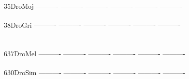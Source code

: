 \documentclass[11pt,twoside,reqno,a4paper]{article}
\begin{document}
{35\hspace*{3\charwidth}DroMoj	----------	----------	----------	----------	----------	----------	\\
\hspace*{5\charwidth}\hspace*{7\charwidth}\hspace*{1\charwidth}\hspace*{1\charwidth}\hspace*{1\charwidth}\hspace*{1\charwidth}\hspace*{1\charwidth}\hspace*{1\charwidth}\\
38\hspace*{3\charwidth}DroGri	----------	----------	----------	----------	----------	----------	\\
\hspace*{5\charwidth}\hspace*{7\charwidth}\hspace*{1\charwidth}\hspace*{1\charwidth}\hspace*{1\charwidth}\hspace*{1\charwidth}\hspace*{1\charwidth}\hspace*{1\charwidth}\\
\\
637\hspace*{2\charwidth}DroMel	----------	----------	----------	----------	----------	----------	\\
\hspace*{5\charwidth}\hspace*{7\charwidth}\hspace*{1\charwidth}\hspace*{1\charwidth}\hspace*{1\charwidth}\hspace*{1\charwidth}\hspace*{1\charwidth}\hspace*{1\charwidth}\\
630\hspace*{2\charwidth}DroSim	----------	----------	----------	----------	----------	----------	\\
\hspace*{5\charwidth}\hspace*{7\charwidth}\hspace*{1\charwidth}\hspace*{1\charwidth}\hspace*{1\charwidth}\hspace*{1\charwidth}\hspace*{1\charwidth}\hspace*{1\charwidth}\\
}
\end{document}
